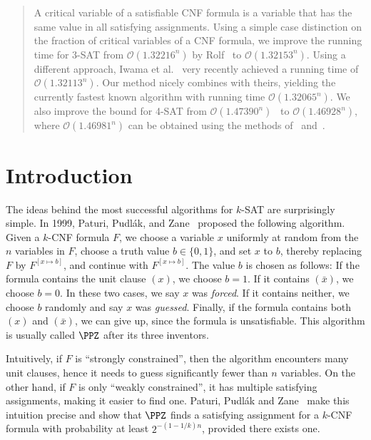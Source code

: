 
\begin{abstract}
  A critical variable of a satisfiable CNF formula is a variable that has the
  same value in all satisfying assignments.  Using a simple case
  distinction on the fraction of critical variables of a CNF formula, we
  improve the running time for
  3-SAT from $\mathcal{O}\!\left(1.32216^{n}\right)$ by Rolf~\cite{rolf2006}
  to $\mathcal{O}\!\left(1.32153^{n}\right)$.
  Using a different approach, Iwama et al.~\cite{istt10} very recently achieved a running time of $\mathcal{O}\!\left(1.32113^{n}\right)$.
  Our method nicely combines with theirs, yielding the currently fastest known algorithm with running time
  $\mathcal{O}\!\left(1.32065^{n}\right)$.
  We also improve the
  bound for 4-SAT from
  $\mathcal{O}\!\left(1.47390^{n}\right)$~\cite{it04} to
  $\mathcal{O}\!\left(1.46928^{n}\right)$, where
  $\mathcal{O}\!\left(1.46981^{n}\right)$ can be obtained using the
  methods of~\cite{it04} and~\cite{rolf2006}.
\end{abstract}

\section{Introduction}

The ideas behind the most successful algorithms for $k$-SAT are
surprisingly simple.  In 1999, Paturi, Pudl\'ak, and Zane~\cite{ppz}
proposed the following algorithm.  Given a $k$-CNF formula $F$, we
choose a variable $x$ uniformly at random from the $n$ variables in
$F$, choose a truth value $b \in \{0,1\}$, and set $x$ to $b$, thereby
replacing $F$ by $F^{[x \mapsto b]}$, and continue with $F^{[x \mapsto
  b]}$.  The value $b$ is chosen as follows: If the formula contains
the unit clause $(x)$, we choose $b=1$. If it contains $(\bar{x})$, we
choose $b=0$.  In these two cases, we say $x$ was {\em forced}. If it
contains neither, we choose $b$ randomly and say $x$ was {\em
  guessed}.  Finally, if the formula contains both $(x)$ and
$(\bar{x})$, we can give up, since the formula is unsatisfiable. This
algorithm is usually called $\PPZ$ after its three inventors.

Intuitively, if $F$ is ``strongly constrained'', then the algorithm
encounters many unit clauses, hence it needs to guess significantly
fewer than $n$ variables. On the other hand, if  $F$ is only
``weakly constrained'', it has multiple satisfying assignments,
making it easier to find one.
Paturi, Pudl\'ak and Zane~\cite{ppz} make this intuition precise and
show that $\PPZ$ finds a satisfying assignment for a $k$-CNF formula with probability at
least $2^{-(1-1/k)n}$, provided there exists one.

